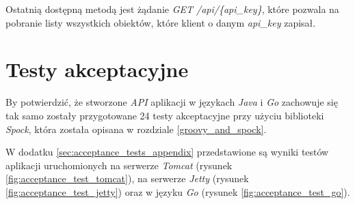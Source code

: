 Ostatnią dostępną metodą jest żądanie \textsl{GET /api/\{api\_key\}}, które pozwala na pobranie listy wszystkich obiektów, które klient o danym \textsl{api\_key} zapisał.

\section{Testy akceptacyjne} 

By potwierdzić, że stworzone \textsl{API} aplikacji w językach \textsl{Java} i \textsl{Go}  zachowuje się tak samo zostały przygotowane 24 testy akceptacyjne przy użyciu biblioteki \textsl{Spock}, która została opisana w rozdziale \ref{groovy_and_spock}.

W dodatku \ref{sec:acceptance_tests_appendix}  przedstawione są wyniki testów aplikacji uruchomionych na serwerze \textsl{Tomcat} (rysunek \ref{fig:acceptance_test_tomcat}), na serwerze \textsl{Jetty} (rysunek \ref{fig:acceptance_test_jetty}) oraz w języku \textsl{Go} (rysunek \ref{fig:acceptance_test_go}).


